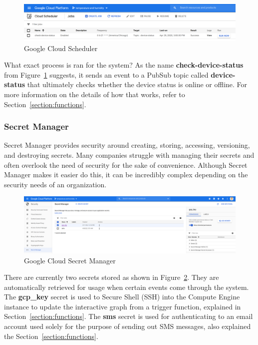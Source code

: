 \documentclass{article}
\begin{document}
\begin{figure}[H]
    \center
    \includegraphics[width=\textwidth]{images/scheduler.png}
    \caption{Google Cloud Scheduler}
    \label{fig:scheduler}
\end{figure}

What exact process is ran for the system? As the name \textbf{check-device-status} from Figure~\ref{fig:scheduler} suggests, it sends an event to a PubSub topic called \textbf{device-status} that ultimately checks whether the device status is online or offline. For more information on the details of how that works, refer to Section~\ref{section:functions}.

\subsubsection{Secret Manager}
Secret Manager provides security around creating, storing, accessing, versioning, and destroying secrets. Many companies struggle with managing their secrets and often overlook the need of security for the sake of convenience. Although Secret Manager makes it easier do this, it can be incredibly complex depending on the security needs of an organization.

\begin{figure}[H]
    \center
    \includegraphics[width=\textwidth]{images/secret-manager.png}
    \caption{Google Cloud Secret Manager}
    \label{fig:secret-manager}
\end{figure}

There are currently two secrets stored as shown in Figure~\ref{fig:secret-manager}. They are automatically retrieved for usage when certain events come through the system. The \textbf{gcp\_key} secret is used to Secure Shell (SSH) into the Compute Engine instance to update the interactive graph from a trigger function, explained in Section~\ref{section:functions}. The \textbf{sms} secret is used for authenticating to an email account used solely for the purpose of sending out SMS messages, also explained the Section~\ref{section:functions}.
\end{document}
